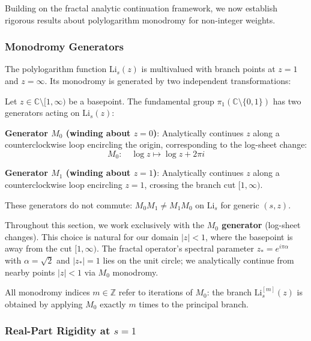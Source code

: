 Building on the fractal analytic continuation framework, we now establish rigorous results about polylogarithm monodromy for non-integer weights.

\subsubsection{Monodromy Generators}

The polylogarithm function $\mathrm{Li}_s(z)$ is multivalued with branch points at $z=1$ and $z=\infty$. Its monodromy is generated by two independent transformations:

\begin{definition}\label{def:monodromy-generators}
Let $z \in \mathbb{C}\setminus[1,\infty)$ be a basepoint. The fundamental group $\pi_1(\mathbb{C}\setminus\{0,1\})$ has two generators acting on $\mathrm{Li}_s(z)$:

\textbf{Generator $M_0$ (winding about $z=0$)}: Analytically continues $z$ along a counterclockwise loop encircling the origin, corresponding to the log-sheet change:
\begin{equation}
M_0: \quad \log z \mapsto \log z + 2\pi i
\end{equation}

\textbf{Generator $M_1$ (winding about $z=1$)}: Analytically continues $z$ along a counterclockwise loop encircling $z=1$, crossing the branch cut $[1,\infty)$.

These generators do not commute: $M_0 M_1 \neq M_1 M_0$ on $\mathrm{Li}_s$ for generic $(s,z)$.
\end{definition}

\begin{remark}
Throughout this section, we work exclusively with the \textbf{$M_0$ generator} (log-sheet changes). This choice is natural for our domain $|z| < 1$, where the basepoint is away from the cut $[1,\infty)$. The fractal operator's spectral parameter $z_* = e^{i\pi\alpha}$ with $\alpha = \sqrt{2}$ and $|z_*| = 1$ lies on the unit circle; we analytically continue from nearby points $|z| < 1$ via $M_0$ monodromy.

All monodromy indices $m \in \mathbb{Z}$ refer to iterations of $M_0$: the branch $\mathrm{Li}_s^{[m]}(z)$ is obtained by applying $M_0$ exactly $m$ times to the principal branch.
\end{remark}

\subsubsection{Real-Part Rigidity at \texorpdfstring{$s=1$}{s=1}}

